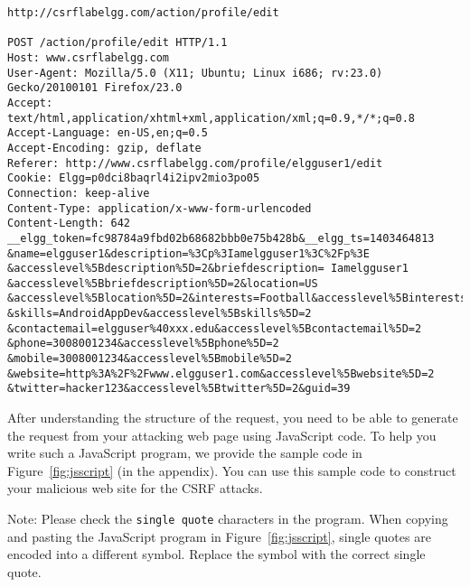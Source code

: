 {\footnotesize
\begin{Verbatim}[frame=single]
 http://csrflabelgg.com/action/profile/edit

POST /action/profile/edit HTTP/1.1
Host: www.csrflabelgg.com
User-Agent: Mozilla/5.0 (X11; Ubuntu; Linux i686; rv:23.0) Gecko/20100101 Firefox/23.0
Accept: text/html,application/xhtml+xml,application/xml;q=0.9,*/*;q=0.8
Accept-Language: en-US,en;q=0.5
Accept-Encoding: gzip, deflate
Referer: http://www.csrflabelgg.com/profile/elgguser1/edit
Cookie: Elgg=p0dci8baqrl4i2ipv2mio3po05
Connection: keep-alive
Content-Type: application/x-www-form-urlencoded
Content-Length: 642
__elgg_token=fc98784a9fbd02b68682bbb0e75b428b&__elgg_ts=1403464813
&name=elgguser1&description=%3Cp%3Iamelgguser1%3C%2Fp%3E
&accesslevel%5Bdescription%5D=2&briefdescription= Iamelgguser1
&accesslevel%5Bbriefdescription%5D=2&location=US
&accesslevel%5Blocation%5D=2&interests=Football&accesslevel%5Binterests%5D=2
&skills=AndroidAppDev&accesslevel%5Bskills%5D=2
&contactemail=elgguser%40xxx.edu&accesslevel%5Bcontactemail%5D=2
&phone=3008001234&accesslevel%5Bphone%5D=2
&mobile=3008001234&accesslevel%5Bmobile%5D=2
&website=http%3A%2F%2Fwww.elgguser1.com&accesslevel%5Bwebsite%5D=2
&twitter=hacker123&accesslevel%5Btwitter%5D=2&guid=39
\end{Verbatim}
}

After understanding the structure of the request, you need to 
be able to generate the request from your attacking web page
using JavaScript code. 
To help you write such a JavaScript program,  we provide the
sample code in Figure~\ref{fig:jsscript} (in the appendix). 
You can use this sample code to construct your malicious web site
for the CSRF attacks.


Note: Please check the {\tt single quote} characters in the program. When
copying and pasting the JavaScript program in Figure~\ref{fig:jsscript}, single quotes are encoded
into a different symbol. Replace the symbol with the correct single quote.


